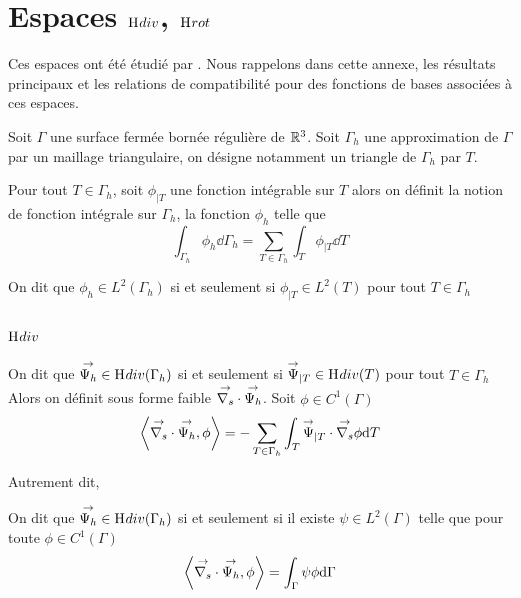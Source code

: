 \section[Espaces Hdiv Hrot]{Espaces \(\mathrm{H}_\mathrm{{}}{div}\), \(\mathrm{H}_\mathrm{{}}{rot}\)}

Ces espaces ont été étudié par \cite{nedelec_mixed_1980}. Nous rappelons dans cette annexe, les résultats principaux et les relations de compatibilité pour des fonctions de bases associées à ces espaces.

Soit \(\Gamma\) une surface fermée bornée régulière de \(\mathbb R^3\).
Soit \(\Gamma_h\) une approximation de \(\Gamma\) par un maillage triangulaire, on désigne notamment un triangle de \(\Gamma_h\) par \(T\).

\begin{defn}
    Pour tout \(T \in \Gamma_h\), soit \(\phi_{|T}\) une fonction intégrable sur \(T\) alors
    on définit la notion de fonction intégrale sur \(\Gamma_h\), la fonction \(\phi_h\) telle que
    \begin{equation}
        \int_{\Gamma_h} \phi_h \dd{\Gamma_h} = \sum_{T\in\Gamma_h} \int_T \phi_{|T} \dd{T}
    \end{equation}
\end{defn}

\begin{defn}
    On dit que \(\phi_h \in L^2(\Gamma_h)\) si et seulement si \(\phi_{|T} \in L^2(T)\) pour tout \(T \in \Gamma_h\)
\end{defn}

\subsection[Hdiv]{\(\mathrm{H}_\mathrm{{}}{div}\)}

\begin{defn}
    On dit que \({\overset{\rightarrow}{\Psi_h}} \in \mathrm{H}_\mathrm{{}}{div}(\Gamma_h)\) si et seulement si \({\overset{\rightarrow}{\Psi}}_{|T} \in \mathrm{H}_\mathrm{{}}{div}(T)\) pour tout \(T \in \Gamma_h\)
    Alors on définit sous forme faible \({\overset{\rightarrow}{\nabla_s}} \cdot {\overset{\rightarrow}{\Psi_h}} \).
    Soit \(\phi \in C^1(\Gamma)\)
    \begin{equation}
        \left< \vdivs \vect{\Psi_h}, \phi \right> %
        = - \sum_{T\in\Gamma_h} \int_T \vect{\Psi}_{|T} \cdot \vgrads \phi\dd{T}
    \end{equation}
\end{defn}

Autrement dit, \cite[eq.~5.3]{bendali_equations_2014}
\begin{defn}
    On dit que \({\overset{\rightarrow}{\Psi_h}} \in \mathrm{H}_\mathrm{{}}{div}(\Gamma_h)\) si et seulement si il existe \(\psi\in L^2(\Gamma)\) telle que pour toute \(\phi \in C^1(\Gamma)\)
    \begin{equation}
        \left< {\overset{\rightarrow}{\nabla_s}} \cdot {\overset{\rightarrow}{\Psi_h}}, \phi \right> = \int_\Gamma \psi \phi \mathrm{d}{\Gamma}
    \end{equation}
\end{defn}

